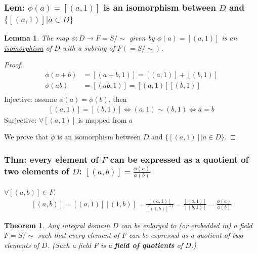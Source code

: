 \documentclass[11pt,a4paper]{article}
\newtheorem{theorem}{Theorem}
\newtheorem{lemma}{Lemma}
\begin{document}
\subsubsection{Lem: $\phi(a)=[(a,1)]$ is an isomorphism between $D$ and $\{[(a,1)]|a\in D\}$}
\begin{lemma}
    The map $\phi : D \rightarrow F=S/\sim$ given by $\phi(a) = [(a, 1)]$ is an \underline{isomorphism} of $D$ with a subring of $F(=S/\sim)$.
\end{lemma}
\begin{proof}
    \begin{equation}
        \begin{aligned}
            \phi(a+b) &= [(a+b, 1)]=[(a,1)]+[(b,1)]\\
            \phi(ab) &= [(ab, 1)]=[(a,1)][(b,1)]\\
        \end{aligned}
        \nonumber
    \end{equation}
    Injective: assume $\phi(a)=\phi(b)$, then
    \begin{equation}
        \begin{aligned}
            [(a, 1)]=[(b,1)]\Leftrightarrow	(a,1)\sim (b,1) \Leftrightarrow	a=b
        \end{aligned}
        \nonumber
    \end{equation}
    Surjective: $\forall [(a,1)]$ is mapped from $a$

    We prove that $\phi$ is an isomorphism between $D$ and $\{[(a,1)]|a\in D\}$.
\end{proof}

\subsubsection{Thm: every
element of $F$ can be expressed as a quotient of two elements of $D$: $[(a,b)]=\frac{\phi(a)}{\phi(b)}$}
$\forall [(a,b)]\in F$,
\begin{equation}
    \begin{aligned}
        [(a,b)]=[(a,1)][(1,b)]=\frac{[(a,1)]}{[(1,b)]^{-1}}=\frac{[(a,1)]}{[(b,1)]}=\frac{\phi(a)}{\phi(b)}
    \end{aligned}
    \nonumber
\end{equation}
\begin{theorem}
    Any integral domain $D$ can be enlarged to (or embedded in) a field $F=S/\sim$ such that every
    element of $F$ can be expressed as a quotient of two elements of $D$. (Such a field F is a
    \textbf{field of quotients} of $D$.)
\end{theorem}
\end{document}
